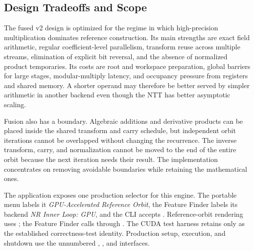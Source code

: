 \subsection{Design Tradeoffs and Scope}
\label{subsec:fused-ntt-tradeoffs}

The fused v2 design is optimized for the regime in which high-precision
multiplication dominates reference construction.  Its main strengths are exact
field arithmetic, regular coefficient-level parallelism, transform reuse across
multiple streams, elimination of explicit bit reversal, and the absence of
normalized product temporaries.  Its costs are root and workspace preparation,
global barriers for large stages, modular-multiply latency, and occupancy
pressure from registers and shared memory.  A shorter operand may therefore be
better served by simpler arithmetic in another backend even though the NTT has
better asymptotic scaling.

Fusion also has a boundary.  Algebraic additions and derivative products can be
placed inside the shared transform and carry schedule, but independent orbit
iterations cannot be overlapped without changing the recurrence.  The inverse
transform, carry, and normalization cannot be moved to the end of the entire
orbit because the next iteration needs their result.  The implementation
concentrates on removing avoidable boundaries while retaining the mathematical
ones.

The application exposes one production selector for this engine.  The portable
menu labels it \emph{GPU-Accelerated Reference Orbit}, the Feature Finder labels
its backend \emph{NR Inner Loop: GPU}, and the CLI accepts .
Reference-orbit rendering uses ; the Feature Finder calls
 through
.  The CUDA test harness retains
 only as the established correctness-test
identity.  Production setup, execution, and shutdown use the unnumbered
,
, and
 interfaces.
